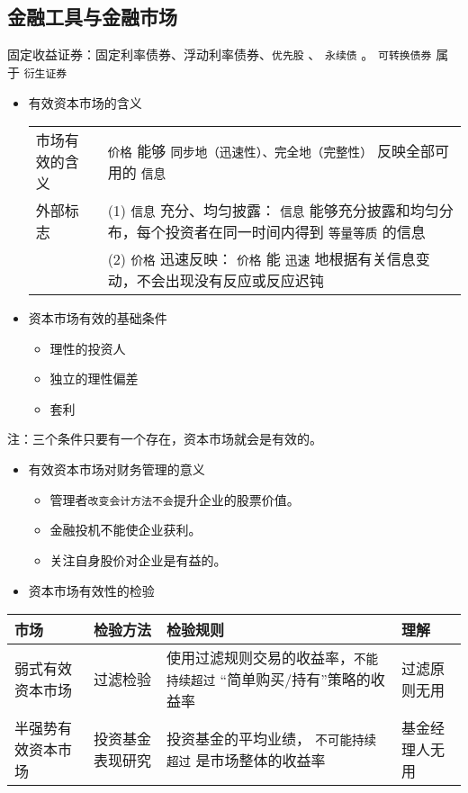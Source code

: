 \documentclass[11pt]{article}
\begin{document}
\subsection{金融工具与金融市场}
\label{sec:org8448cca}
固定收益证券：固定利率债券、浮动利率债券、\texttt{优先股} 、 \texttt{永续债} 。
\texttt{可转换债券} 属于 \texttt{衍生证券}
\begin{itemize}
\item 有效资本市场的含义
\begin{center}
\begin{tabular}{ll}
市场有效的含义 & \texttt{价格} 能够 \texttt{同步地（迅速性）、完全地（完整性）} 反映全部可用的 \texttt{信息}\\
外部标志 & (1) \texttt{信息} 充分、均匀披露： \texttt{信息} 能够充分披露和均匀分布，每个投资者在同一时间内得到 \texttt{等量等质} 的信息\\
 & (2) \texttt{价格} 迅速反映： \texttt{价格} 能 \texttt{迅速} 地根据有关信息变动，不会出现没有反应或反应迟钝\\
\end{tabular}
\end{center}
\item 资本市场有效的基础条件
\begin{itemize}
\item 理性的投资人
\item 独立的理性偏差
\item 套利
\end{itemize}
\end{itemize}
注：三个条件只要有一个存在，资本市场就会是有效的。
\begin{itemize}
\item 有效资本市场对财务管理的意义
\begin{itemize}
\item 管理者\texttt{改变会计方法不会}提升企业的股票价值。
\item 金融投机不能使企业获利。
\item 关注自身股价对企业是有益的。
\end{itemize}
\item 资本市场有效性的检验
\end{itemize}
\begin{center}
\begin{tabular}{llll}
市场 & 检验方法 & 检验规则 & 理解\\
\hline
弱式有效资本市场 & 过滤检验 & 使用过滤规则交易的收益率，\texttt{不能持续超过} ``简单购买/持有''策略的收益率 & 过滤原则无用\\
\hline
半强势有效资本市场 & 投资基金表现研究 & 投资基金的平均业绩， \texttt{不可能持续超过} 是市场整体的收益率 & 基金经理人无用\\
\end{tabular}
\end{center}
\end{document}

